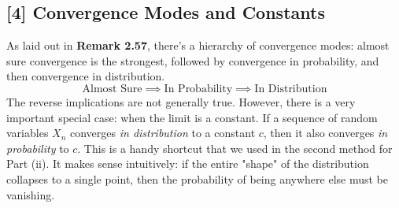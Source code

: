 \documentclass[11pt,a4paper]{article}
\begin{document}
\hypertarget{note4}{\subsection*{[4] Convergence Modes and Constants}}
As laid out in \textbf{Remark 2.57}, there's a hierarchy of convergence modes: almost sure convergence is the strongest, followed by convergence in probability, and then convergence in distribution.
\[ \text{Almost Sure} \implies \text{In Probability} \implies \text{In Distribution} \]
The reverse implications are not generally true. However, there is a very important special case: when the limit is a constant. If a sequence of random variables $X_n$ converges \textit{in distribution} to a constant $c$, then it also converges \textit{in probability} to $c$. This is a handy shortcut that we used in the second method for Part (ii). It makes sense intuitively: if the entire "shape" of the distribution collapses to a single point, then the probability of being anywhere else must be vanishing.
\end{document}
